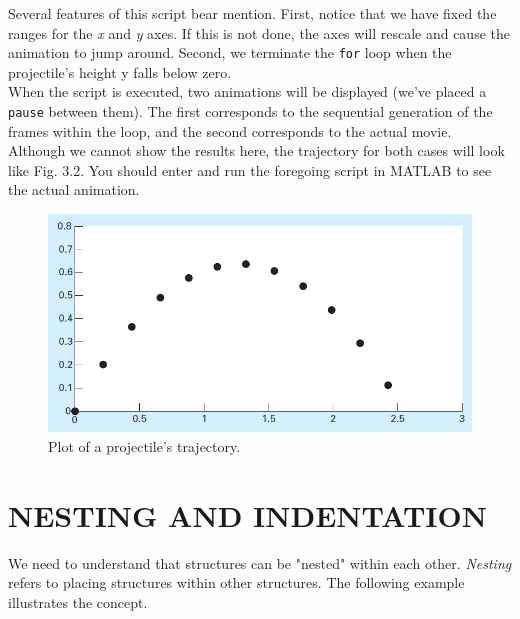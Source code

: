 \documentclass[../main.tex]{subfiles}
\begin{document}
\begin{example}
    Several features of this script bear mention. First, notice that we have fixed the ranges for
the \emph{x} and \emph{y} axes. If this is not done, the axes will rescale and cause the animation to jump
around. Second, we terminate the \texttt{for} loop when the projectile's height y falls below zero.\\
\indent When the script is executed, two animations will be displayed (we've placed a \texttt{pause}
between them). The first corresponds to the sequential generation of the frames within the
loop, and the second corresponds to the actual movie. Although we cannot show the results
here, the trajectory for both cases will look like Fig. 3.2. You should enter and run the foregoing
script in MATLAB to see the actual animation.\\

\begin{figure}[h]
    \includegraphics[width=0.8\linewidth]{./images/example_3_3_2}
    \caption{Plot of a projectile's trajectory.}
\end{figure}

\end{example}

\section{NESTING AND INDENTATION}
\noindent We need to understand that structures can be "nested" within each other. \emph{Nesting} refers to
placing structures within other structures. The following example illustrates the concept.\\
\end{document}
